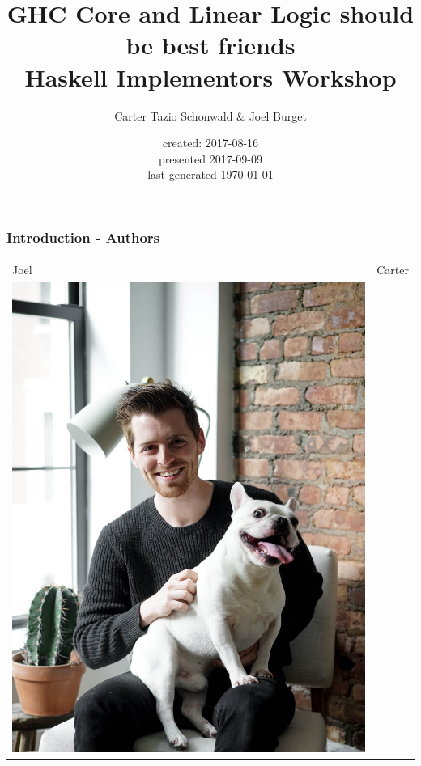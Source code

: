 \documentclass[11pt,reqno]{beamer}
\newcommand{\now}{\fullisodate
  \today  \usdate}
\begin{document}
\title{GHC Core and Linear Logic should be best friends \\ Haskell Implementors Workshop}
\author{Carter Tazio Schonwald \& Joel Burget}
\date{created: 2017-08-16\\ presented 2017-09-09 \\ last generated \now}

\maketitle

\begin{frame}
  \frametitle{Introduction - Authors}

\begin{centering}
\begin{tabular}{l|r}
Joel & Carter  \\
  \includegraphics[scale=0.06]{../joelpics/joel.jpg}   &

\end{tabular}
\end{centering}
\end{frame}
\end{document}
